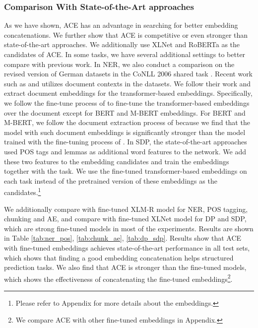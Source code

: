 \documentclass[11pt,a4paper]{article}
\begin{document}
\subsubsection{Comparison With State-of-the-Art approaches} \label{sec:exp:finetune}
As we have shown, ACE has an advantage in searching for better embedding concatenations. We further show that ACE is competitive or even stronger than state-of-the-art approaches. We additionally use XLNet \citep{yang2019xlnet} and RoBERTa as the candidates of ACE.  In some tasks, we have several additional settings to better compare with previous work. In NER, we also conduct a comparison on the revised version of German datasets in the CoNLL 2006 shared task \citep{buchholz-marsi-2006-conll}. Recent work such as \citet{yu-etal-2020-named} and \citet{yamada-etal-2020-luke} utilizes document contexts in the datasets. We follow their work and extract document embeddings for the transformer-based embeddings. Specifically, we follow the fine-tune process of \citet{yamada-etal-2020-luke} to fine-tune the transformer-based embeddings over the document except for BERT and M-BERT embeddings. For BERT and M-BERT, we follow the document extraction process of \citet{yu-etal-2020-named} because we find that the model with such document embeddings is significantly stronger than the model trained with the fine-tuning process of \citet{yamada-etal-2020-luke}. In SDP, the state-of-the-art approaches used POS tags and lemmas as additional word features to the network. We add these two features to the embedding candidates and train the embeddings together with the task. We use the fine-tuned transformer-based embeddings on each task instead of the pretrained version of these embeddings as the candidates.\footnote{Please refer to Appendix for more details about the embeddings.}

We additionally compare with fine-tuned XLM-R model for NER, POS tagging, chunking and AE, and compare with fine-tuned XLNet model for DP and SDP, which are strong fine-tuned models in most of the experiments. Results are shown in Table \ref{tab:ner_pos}, \ref{tab:chunk_ae}, \ref{tab:dp_sdp}.
Results show that ACE with fine-tuned embeddings achieves state-of-the-art performance in all test sets, which shows that finding a good embedding concatenation helps structured prediction tasks. We also find that ACE is stronger than the fine-tuned models, which shows the effectiveness of concatenating the fine-tuned embeddings\footnote{We compare ACE with other fine-tuned embeddings in Appendix.}.
\end{document}
